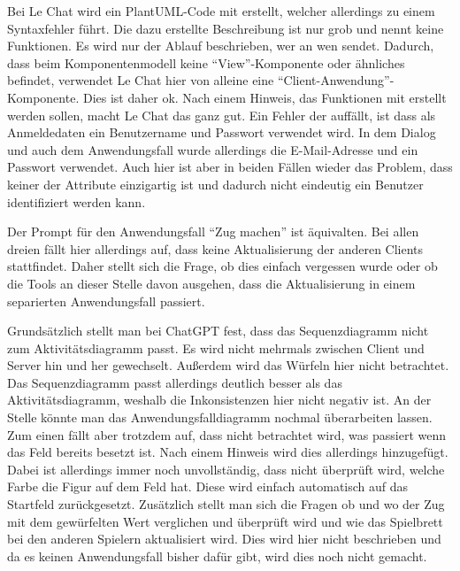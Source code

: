 Bei Le Chat wird ein PlantUML-Code mit erstellt, welcher allerdings zu einem Syntaxfehler führt. Die dazu erstellte 
Beschreibung ist nur grob und nennt keine Funktionen. Es wird nur der Ablauf beschrieben, wer an wen sendet. Dadurch, 
dass beim Komponentenmodell keine ``View''-Komponente oder ähnliches befindet, verwendet Le Chat hier von alleine 
eine ``Client-Anwendung''-Komponente. Dies ist daher ok. Nach einem Hinweis, das Funktionen mit erstellt werden sollen, macht Le Chat 
das ganz gut. Ein Fehler der auffällt, ist dass als Anmeldedaten ein Benutzername und Passwort verwendet wird. In dem Dialog 
und auch dem Anwendungsfall wurde allerdings die E-Mail-Adresse und ein Passwort verwendet. Auch hier ist aber in beiden Fällen 
wieder das Problem, dass keiner der Attribute einzigartig ist und dadurch nicht eindeutig ein Benutzer identifiziert werden kann.

Der Prompt für den Anwendungsfall ``Zug machen'' ist äquivalten. Bei allen dreien fällt hier allerdings auf, dass 
keine Aktualisierung der anderen Clients stattfindet. Daher stellt sich die Frage, ob dies einfach vergessen wurde 
oder ob die Tools an dieser Stelle davon ausgehen, dass die Aktualisierung in einem separierten Anwendungsfall 
passiert.

Grundsätzlich stellt man bei ChatGPT fest, dass das Sequenzdiagramm nicht zum Aktivitätsdiagramm passt. Es wird nicht mehrmals 
zwischen Client und Server hin und her gewechselt. Außerdem wird das Würfeln hier nicht betrachtet. Das Sequenzdiagramm 
passt allerdings deutlich besser als das Aktivitätsdiagramm, weshalb die Inkonsistenzen hier nicht negativ ist. An der Stelle 
könnte man das Anwendungsfalldiagramm nochmal überarbeiten lassen. Zum einen fällt aber trotzdem auf, dass nicht betrachtet 
wird, was passiert wenn das Feld bereits besetzt ist. Nach einem Hinweis wird dies allerdings hinzugefügt. Dabei ist 
allerdings immer noch unvollständig, dass nicht überprüft wird, welche Farbe die Figur auf dem Feld hat. Diese wird 
einfach automatisch auf das Startfeld zurückgesetzt. Zusätzlich stellt man sich die Fragen ob und wo der Zug mit dem
gewürfelten Wert verglichen und überprüft wird und wie das Spielbrett bei den anderen Spielern aktualisiert wird.
Dies wird hier nicht beschrieben und da es keinen Anwendungsfall bisher dafür gibt, wird dies noch nicht gemacht. 

